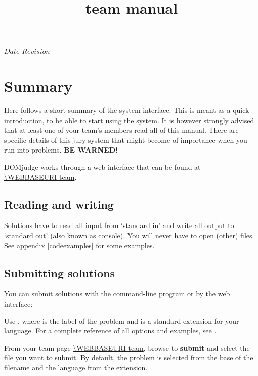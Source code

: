

\usepackage[english]{babel}

\SVN $Date$
\SVN $Revision$

\title{\DOMjudge team manual}





\section*{Summary}

Here follows a short summary of the system interface. This is meant as
a quick introduction, to be able to start using the system. It is
however strongly advised that at least one of your team's members
read all of this manual. There are specific details of this
jury system that might become of importance when you run into
problems. \textbf{BE WARNED!}

DOMjudge works through a web interface that can be found at\\
\url{\WEBBASEURI team}.

\subsection*{Reading and writing}

Solutions have to read all input from `standard in' and write all
output to `standard out' (also known as console). You will never have
to open (other) files. See appendix \ref{codeexamples} for some
examples.

\subsection*{Submitting solutions}

You can submit solutions with the command-line program  or
by the web interface:
\begin{description}[\breaklabel\setlabelstyle{\bfseries}]
\item[Command-line]
Use , where  is the
label of the problem and  is a standard extension for
your language.  For a complete reference of all options and examples,
see .
\item[Web interface]
From your team page \url{\WEBBASEURI team}, browse to
\textbf{submit} and select the file you want to submit. By default,
the problem is selected from the base of the filename and the language
from the extension.
\end{description}

